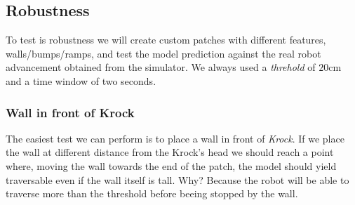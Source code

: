 \documentclass[../document.tex]{subfiles}
\begin{document}
\subsection{Robustness}
To test is robustness we will create custom patches with different features, walls/bumps/ramps, and test the model prediction against the real robot advancement obtained from the simulator. We always used a \emph{threhold} of $20$cm and a time window of two seconds. 
\subsubsection{Wall in front of Krock}
The easiest test we can perform is to place a wall in front of \emph{Krock}. If we place the wall at different distance from the Krock's head we should reach a point where, moving the wall towards the end of the patch, the model should yield traversable even if the wall itself is tall. Why? Because the robot will be able to traverse more than the threshold before beeing stopped by the wall.
\end{document}
